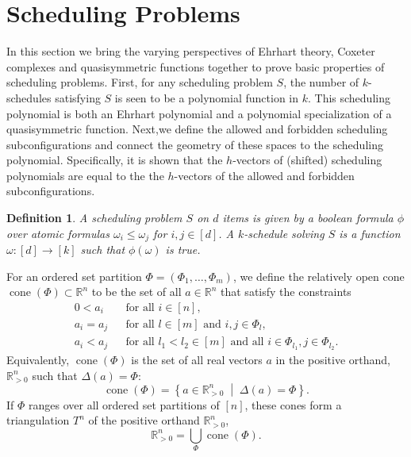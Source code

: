 \documentclass[12pt,reqno]{amsart}
\newtheorem{definition}{Definition}
\numberwithin{definition}{section}
\newtheorem{lemma}[definition]{Lemma}
\theoremstyle{definition}
\newcommand{\RR}{\mathbb{R}}
\newcommand{\SSS}{\mathcal{S}}
\newcommand{\defn}[1]{\emph{#1}}
\newcommand{\cone}{\operatorname{cone}}
\newcommand{\mset}[2]{ \left\{ #1 \; \middle| \; #2 \right\}}
\newcommand{\poly}{\chi} %
\newcommand{\comment}[1]{\textsf{\footnotesize #1}}
\begin{document}




\section{Scheduling Problems}
\label{sec:scheduling-problems}

In this section we bring the varying perspectives of Ehrhart theory, Coxeter complexes and quasisymmetric functions together to prove basic properties of scheduling problems.  First, for any scheduling problem $S$, the number of $k$-schedules satisfying $S$ is seen to be a polynomial function in $k$.  This scheduling polynomial is both an Ehrhart polynomial and a polynomial specialization of a quasisymmetric function.  Next,we define the allowed and forbidden scheduling subconfigurations and connect the geometry of these spaces to the scheduling polynomial.  Specifically, it is shown that the $h$-vectors of (shifted) scheduling polynomials are equal to the the $h$-vectors of the allowed and forbidden subconfigurations.  


\begin{definition}
A \defn{scheduling problem} $S$ on $d$ items is given by a boolean
formula $\phi$ over atomic formulas $\omega_i\leq \omega_j$ for
$i,j\in[d]$. A \defn{$k$-schedule} solving $S$ is a function
$\omega:[d]\rightarrow[k]$ such that $\phi(\omega)$ is true.
\end{definition}



For an ordered set partition $\Phi=(\Phi_1,\ldots,\Phi_m)$, we define the relatively open cone $\cone(\Phi)\subset\RR^n$ to be the set of all $a\in\RR^n$ that satisfy the constraints
\begin{eqnarray*}
0 < a_i && \text{for all $i\in[n]$}, \\
a_i = a_j && \text{for all $l\in[m]$ and $i,j\in\Phi_l$}, \\
a_i < a_j && \text{for all $l_1 < l_2\in[m]$ and all $i\in\Phi_{l_1}, j\in\Phi_{l_2}$}.
\end{eqnarray*}
Equivalently, $\cone(\Phi)$ is the set of all real vectors $a$ in the positive orthand, $\RR_{> 0}^n$ such that $\Delta(a)=\Phi$: 
\[
\cone(\Phi) = \mset{a\in\RR_{> 0}^n}{\Delta(a)=\Phi}.
\]
 If $\Phi$ ranges over all ordered set partitions of $[n]$, these cones form a triangulation $T^n$ of the positive orthand $\RR_{> 0}^n$, 
\[
  \RR_{> 0}^n = \bigcup_\Phi \cone(\Phi).
\]
\end{document}
